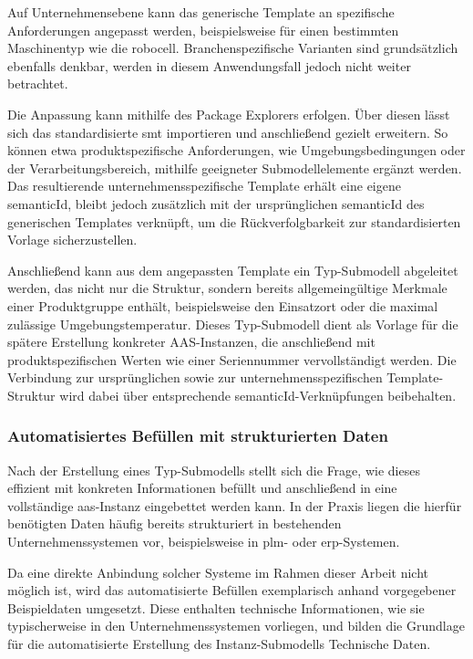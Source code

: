 Auf Unternehmensebene kann das generische Template an spezifische Anforderungen angepasst werden, beispielsweise für einen bestimmten Maschinentyp wie die robocell.
Branchenspezifische Varianten sind grundsätzlich ebenfalls denkbar, werden in diesem Anwendungsfall jedoch nicht weiter betrachtet.

Die Anpassung kann mithilfe des Package Explorers erfolgen.
Über diesen lässt sich das standardisierte \acs{smt} importieren und anschließend gezielt erweitern.
So können etwa produktspezifische Anforderungen, wie Umgebungsbedingungen oder der Verarbeitungsbereich, mithilfe geeigneter Submodellelemente ergänzt werden.
Das resultierende unternehmensspezifische Template erhält eine eigene semanticId, bleibt jedoch zusätzlich mit der ursprünglichen semanticId des generischen Templates verknüpft, um die Rückverfolgbarkeit zur standardisierten Vorlage sicherzustellen.

Anschließend kann aus dem angepassten Template ein Typ-Submodell abgeleitet werden, das nicht nur die Struktur, sondern bereits allgemeingültige Merkmale einer Produktgruppe enthält, beispielsweise den Einsatzort oder die maximal zulässige Umgebungstemperatur.
Dieses Typ-Submodell dient als Vorlage für die spätere Erstellung konkreter AAS-Instanzen, die anschließend mit produktspezifischen Werten wie einer Seriennummer vervollständigt werden.
Die Verbindung zur ursprünglichen sowie zur unternehmensspezifischen Template-Struktur wird dabei über entsprechende semanticId-Verknüpfungen beibehalten.


\subsubsection{Automatisiertes Befüllen mit strukturierten Daten}
Nach der Erstellung eines Typ-Submodells stellt sich die Frage, wie dieses effizient mit konkreten Informationen befüllt und anschließend in eine vollständige \acs{aas}-Instanz eingebettet werden kann.
In der Praxis liegen die hierfür benötigten Daten häufig bereits strukturiert in bestehenden Unternehmenssystemen vor, beispielsweise in \acs{plm}- oder \acs{erp}-Systemen.

Da eine direkte Anbindung solcher Systeme im Rahmen dieser Arbeit nicht möglich ist, wird das automatisierte Befüllen exemplarisch anhand vorgegebener Beispieldaten umgesetzt.
Diese enthalten technische Informationen, wie sie typischerweise in den Unternehmenssystemen vorliegen, und bilden die Grundlage für die automatisierte Erstellung des Instanz-Submodells Technische Daten.

